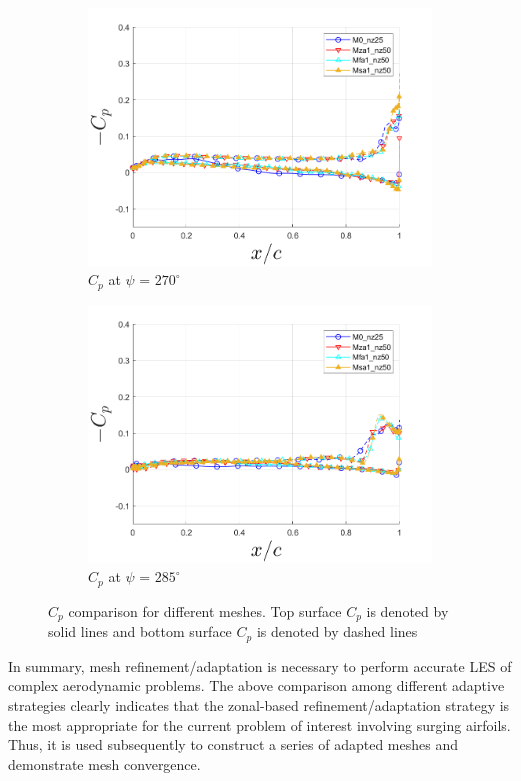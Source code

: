 \begin{figure}[H]
\begin{subfigure}[b]{0.475\textwidth}
\includegraphics[width=1\textwidth]{figures/Results/Cp_plots/Cp_ph_270.png}
\caption{ $C_p$ at $\psi$ = $270^\circ$}
\label{fig:Cp_270}
\end{subfigure}
\begin{subfigure}[b]{0.475\textwidth}
\centering
\includegraphics[width=1\textwidth]{figures/Results/Cp_plots/Cp_ph_285.png}
\caption{ $C_p$ at $\psi$ = $285^\circ$}
\label{fig:Cp_285}
\end{subfigure}
\caption{$C_p$ comparison for different meshes. Top surface $C_p$ is denoted by solid lines and bottom surface $C_p$ is denoted by dashed lines}
\label{fig:Cp_plots}
\end{figure}

In summary, mesh refinement/adaptation is necessary to perform accurate LES of complex aerodynamic problems. The above comparison among different adaptive strategies clearly indicates that the zonal-based refinement/adaptation strategy is the most appropriate for the current problem of interest involving surging airfoils. Thus, it is used subsequently to construct a series of adapted meshes and demonstrate mesh convergence.